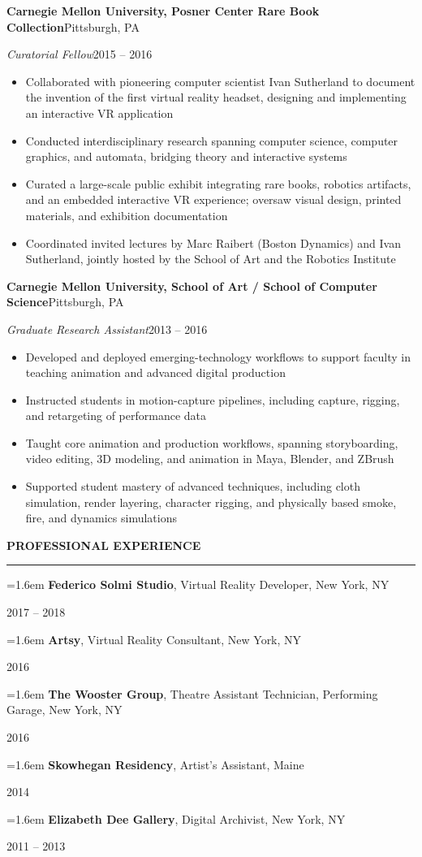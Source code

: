 \documentclass[10pt,letterpaper]{article}
\newcommand{\cvsection}[1]{%
  \par\addvspace{7pt}%
  {\large\bfseries\MakeUppercase{#1}}\par\nobreak
  \vspace{-0.55\baselineskip}\rule{\linewidth}{0.6pt}\par\nobreak\vspace{1.5pt}}
\newcommand{\entry}[4]{%
  \par\addvspace{2.5pt}%
  {\large\bfseries #1}\hfill #2\par\nobreak
  \textit{#3}\hfill #4\par\nobreak}
\newenvironment{bullets}{%
  \begin{itemize}[leftmargin=0.95em,labelsep=0.35em,itemsep=0pt,parsep=0pt,topsep=1pt,partopsep=0pt,
    label={\raisebox{0.25ex}{\tiny$\bullet$}}]}{\end{itemize}}
\newlength{\yw}\setlength{\yw}{0.78in}
\newcommand{\yitem}[2]{%
  \par\noindent\parbox[t]{\dimexpr\linewidth-\yw}{\raggedright\hangindent=1.6em\hangafter=1 #1\strut}%
  \hfill #2\par}
\begin{document}
\entry{Carnegie Mellon University, Posner Center Rare Book Collection}{Pittsburgh, PA}{Curatorial Fellow}{2015 -- 2016}
\begin{bullets}
\item Collaborated with pioneering computer scientist Ivan Sutherland to document the invention of the first virtual reality headset, designing and implementing an interactive VR application
\item Conducted interdisciplinary research spanning computer science, computer graphics, and automata, bridging theory and interactive systems
\item Curated a large-scale public exhibit integrating rare books, robotics artifacts, and an embedded interactive VR experience; oversaw visual design, printed materials, and exhibition documentation
\item Coordinated invited lectures by Marc Raibert (Boston Dynamics) and Ivan Sutherland, jointly hosted by the School of Art and the Robotics Institute
\end{bullets}

\entry{Carnegie Mellon University, School of Art / School of Computer Science}{Pittsburgh, PA}{Graduate Research Assistant}{2013 -- 2016}
\begin{bullets}
\item Developed and deployed emerging-technology workflows to support faculty in teaching animation and advanced digital production
\item Instructed students in motion-capture pipelines, including capture, rigging, and retargeting of performance data
\item Taught core animation and production workflows, spanning storyboarding, video editing, 3D modeling, and animation in Maya, Blender, and ZBrush
\item Supported student mastery of advanced techniques, including cloth simulation, render layering, character rigging, and physically based smoke, fire, and dynamics simulations
\end{bullets}

\cvsection{Professional Experience}
\yitem{\textbf{Federico Solmi Studio}, Virtual Reality Developer, New York, NY}{2017 -- 2018}
\yitem{\textbf{Artsy}, Virtual Reality Consultant, New York, NY}{2016}
\yitem{\textbf{The Wooster Group}, Theatre Assistant Technician, Performing Garage, New York, NY}{2016}
\yitem{\textbf{Skowhegan Residency}, Artist's Assistant, Maine}{2014}
\yitem{\textbf{Elizabeth Dee Gallery}, Digital Archivist, New York, NY}{2011 -- 2013}
\end{document}
